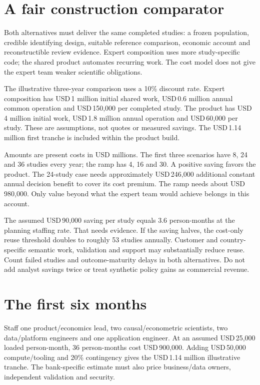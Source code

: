 \documentclass[11pt,a4paper,openany]{book}
\begin{document}
\section*{A fair construction comparator}
Both alternatives must deliver the same completed studies: a frozen
population, credible identifying design, suitable reference comparison,
economic account and reconstructible review evidence. Expert composition
uses more study-specific code; the shared product automates recurring work.
The cost model does not give the expert team weaker scientific obligations.

The illustrative three-year comparison uses a 10\% discount rate.
Expert composition has USD\,1 million initial shared work, USD\,0.6 million
annual common operation and USD\,150,000 per completed study. The product
has USD\,4 million initial work, USD\,1.8 million annual operation and
USD\,60,000 per study. These are assumptions, not quotes or measured savings.
The USD\,1.14 million first tranche is included within the product build.

\begin{center}\small

\end{center}
Amounts are present costs in USD millions. The first three scenarios have
8, 24 and 36 studies every year; the ramp has 4, 16 and 30. A positive
saving favors the product. The 24-study case needs approximately
USD\,246,000 additional constant annual decision benefit to cover its cost
premium. The ramp needs about USD\,980,000. Only value beyond what the expert
team would achieve belongs in this account.

The assumed USD\,90,000 saving per study equals 3.6 person-months at the
planning staffing rate. That needs evidence. If the saving halves, the
cost-only reuse threshold doubles to roughly 53 studies annually. Customer
and country-specific semantic work, validation and support may substantially
reduce reuse. Count failed studies and outcome-maturity delays in both
alternatives. Do not add analyst savings twice or treat synthetic policy
gains as commercial revenue.

\section*{The first six months}
Staff one product/economics lead, two causal/econometric scientists, two
data/platform engineers and one application engineer. At an assumed
USD\,25,000 loaded person-month, 36 person-months cost USD\,900,000.
Adding USD\,50,000 compute/tooling and 20\% contingency gives the
USD\,1.14 million illustrative tranche. The bank-specific estimate must
also price business/data owners, independent validation and security.
\end{document}
